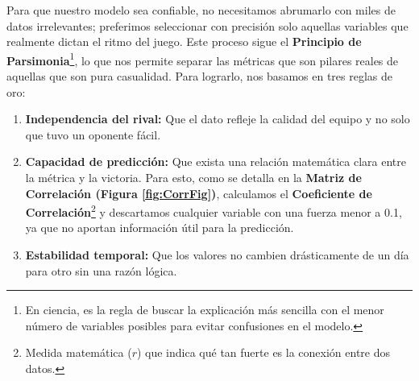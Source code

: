 \documentclass[twocolumn,10pt]{article}
\begin{document}
Para que nuestro modelo sea confiable, no necesitamos abrumarlo con miles de datos irrelevantes; preferimos seleccionar con precisión solo aquellas variables que realmente dictan el ritmo del juego. Este proceso sigue el \textbf{Principio de Parsimonia}\footnote{En ciencia, es la regla de buscar la explicación más sencilla con el menor número de variables posibles para evitar confusiones en el modelo.}, lo que nos permite separar las métricas que son pilares reales de aquellas que son pura casualidad. Para lograrlo, nos basamos en tres reglas de oro:
\begin{enumerate}
    \item \textbf{Independencia del rival:} Que el dato refleje la calidad del equipo y no solo que tuvo un oponente fácil.
\item \textbf{Capacidad de predicción:} Que exista una relación matemática clara entre la métrica y la victoria. Para esto, como se detalla en la \textbf{Matriz de Correlación (Figura \ref{fig:CorrFig})}, calculamos el \textbf{Coeficiente de Correlación}\footnote{Medida matemática ($r$) que indica qué tan fuerte es la conexión entre dos datos.} y descartamos cualquier variable con una fuerza menor a 0.1, ya que no aportan información útil para la predicción.
    \item \textbf{Estabilidad temporal:} Que los valores no cambien drásticamente de un día para otro sin una razón lógica.
\end{enumerate}
\end{document}
